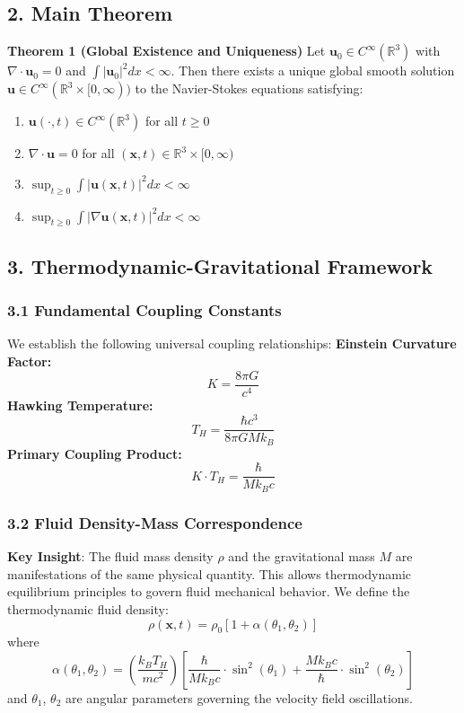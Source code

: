 ﻿\documentclass[12pt]{article}
\begin{document}
\subsection{2. Main Theorem}
\textbf{Theorem 1 (Global Existence and Uniqueness)}
Let $\mathbf{u}_0 \in C^\infty(\mathbb{R}^3)$ with $\nabla\cdot\mathbf{u}_0 = 0$ and $\int|\mathbf{u}_0|^2 dx < \infty$. Then there exists a unique global smooth solution $\mathbf{u} \in C^\infty(\mathbb{R}^3 \times [0,\infty))$ to the Navier-Stokes equations satisfying:
\begin{enumerate}
   \item $\mathbf{u}(\cdot,t) \in C^\infty(\mathbb{R}^3)$ for all $t \ge 0$
   \item $\nabla\cdot\mathbf{u} = 0$ for all $(\mathbf{x},t) \in \mathbb{R}^3 \times [0,\infty)$
   \item $\sup_{t\ge0} \int|\mathbf{u}(\mathbf{x},t)|^2 dx < \infty$
   \item $\sup_{t\ge0} \int|\nabla\mathbf{u}(\mathbf{x},t)|^2 dx < \infty$
\end{enumerate}

\subsection{3. Thermodynamic-Gravitational Framework}
\subsubsection{3.1 Fundamental Coupling Constants}
We establish the following universal coupling relationships:
\textbf{Einstein Curvature Factor:}
$$K = \frac{8\pi G}{c^4}$$
\textbf{Hawking Temperature:}
$$T_H = \frac{\hbar c^3}{8\pi GMk_B}$$
\textbf{Primary Coupling Product:}
$$K\cdot T_H = \frac{\hbar}{Mk_Bc}$$

\subsubsection{3.2 Fluid Density-Mass Correspondence}
\textbf{Key Insight}: The fluid mass density $\rho$ and the gravitational mass $M$ are manifestations of the same physical quantity. This allows thermodynamic equilibrium principles to govern fluid mechanical behavior.
We define the thermodynamic fluid density:
$$\rho(\mathbf{x},t) = \rho_0\left[1 + \alpha(\theta_1,\theta_2)\right]$$
where
$$\alpha(\theta_1,\theta_2) = \left(\frac{k_B T_H}{mc^2}\right)\left[\frac{\hbar}{Mk_Bc}\cdot\sin^2(\theta_1) + \frac{Mk_Bc}{\hbar}\cdot\sin^2(\theta_2)\right]$$
and $\theta_1$, $\theta_2$ are angular parameters governing the velocity field oscillations.
\end{document}
